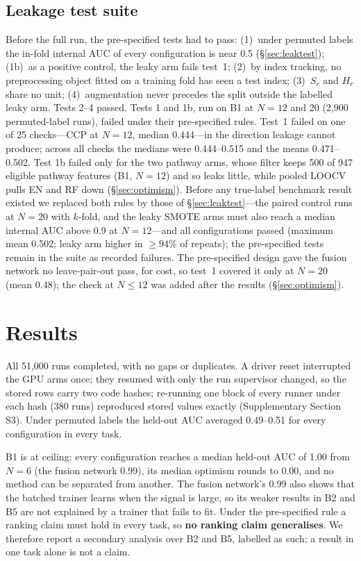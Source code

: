 \documentclass[10pt,letterpaper]{article}
\begin{document}
\subsection{Leakage test suite}\label{sec:gate}
Before the full run, the pre-specified tests had to pass: (1)~under permuted labels the in-fold internal AUC of
every configuration is near 0.5 (\S\ref{sec:leaktest}); (1b)~as a positive control, the leaky arm fails
test~1; (2)~by index tracking, no preprocessing object fitted on a training fold has seen a test index;
(3)~$S_r$ and $H_r$ share no unit; (4)~augmentation never precedes the split outside the labelled leaky arm.
Tests 2--4 passed. Tests 1 and 1b, run on B1 at $N = 12$ and 20 (2,900 permuted-label runs), failed under
their pre-specified rules. Test~1 failed on one of 25 checks---CCP at $N = 12$, median 0.444---in the direction leakage cannot
produce; across all checks the medians were 0.444--0.515 and the means 0.471--0.502. Test 1b failed only for
the two pathway arms, whose filter keeps 500 of 947 eligible pathway features (B1, $N = 12$) and so leaks
little, while pooled LOOCV pulls EN and RF down (\S\ref{sec:optimism}). Before any true-label benchmark result
existed we replaced both rules by those of \S\ref{sec:leaktest}---the paired control runs at $N = 20$ with
$k$-fold, and the leaky SMOTE arms must also reach a median internal AUC above 0.9 at $N = 12$---and all
configurations passed (maximum mean 0.502;
leaky arm higher in $\ge 94\%$ of repeats); the pre-specified tests remain in the suite as recorded failures. The
pre-specified design gave the fusion network no leave-pair-out pass, for cost, so test~1 covered it only at
$N = 20$ (mean 0.48); the check at $N \le 12$ was added after the results (\S\ref{sec:optimism}).

\section{Results}\label{sec:results}

All 51,000 runs completed, with no gaps or duplicates. A driver reset interrupted the GPU arms once; they
resumed with only the run supervisor changed, so the stored rows carry two code hashes; re-running one
block of every runner under each hash (380 runs) reproduced stored values exactly (Supplementary Section S3). Under permuted labels
the held-out AUC averaged 0.49--0.51 for every configuration in every task.

B1 is at ceiling: every configuration reaches a median held-out AUC of 1.00 from $N = 6$ (the fusion network
0.99), its median optimism rounds to 0.00, and no method can be separated from another. The fusion network's 0.99 also
shows that the batched trainer learns when the signal is large, so its weaker results in B2 and B5 are not
explained by a trainer that fails to fit. Under the pre-specified rule a ranking claim must hold in every task,
so \textbf{no ranking claim generalises}. We therefore report a secondary analysis over B2 and B5, labelled
as such; a result in one task alone is not a claim.
\end{document}
